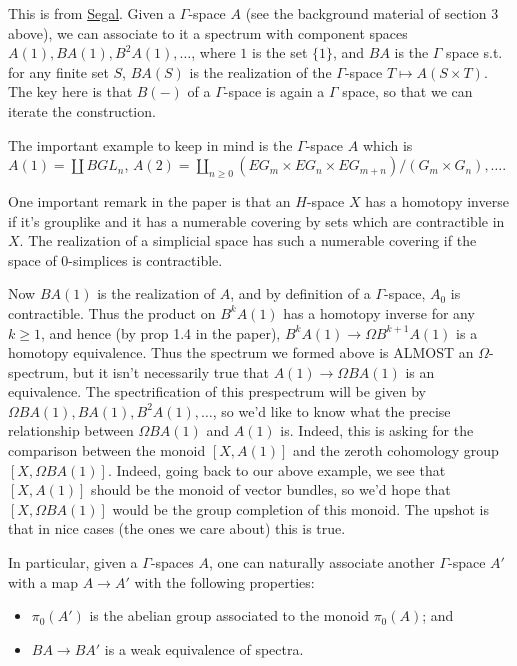 \documentclass[letterpaper]{article}
\theoremstyle{definition}
\begin{document}
This is from
\href{References/CategoriesAndCohomologyTheories.pdf}{Segal}. Given a
$\Gamma$-space $A$ (see the background material of section 3 above), we
can associate to it a spectrum with component spaces $A(1), BA(1),
B^2A(1), \dots $, where $1$ is the set $\{1\}$, and $BA$ is the
$\Gamma$ space s.t. for any finite set $S$, $BA(S)$ is the realization
of the $\Gamma$-space $T \mapsto A(S \times T)$. The key here is that
$B(-)$ of a $\Gamma$-space is again a $\Gamma$ space, so that we can
iterate the construction. 

The important example to keep in mind is the $\Gamma$-space $A$ which
is $A(1) = \coprod BGL_n$, $A(2) = \coprod_{n \geq 0} (EG_m \times
EG_n \times EG_{m+n})/(G_m \times G_n) , \dots$.

One important remark in the paper is that an $H$-space $X$ has a
homotopy inverse if it's grouplike and it has a numerable covering by
sets which are contractible in $X$. The realization of a simplicial
space has such a numerable covering if the space of $0$-simplices is
contractible. 

Now $BA(1)$ is the realization of $A$, and by definition of a
$\Gamma$-space, $A_0$ is contractible. Thus the product on $B^kA(1)$
has a homotopy inverse for any $k \geq 1$, and hence (by prop 1.4 in
the paper), $B^kA(1) \rightarrow \Omega B^{k+1}A(1)$ is a homotopy
equivalence. Thus the spectrum we formed above is ALMOST an
$\Omega$-spectrum, but it isn't necessarily true that $A(1)\rightarrow
\Omega BA(1)$ is an equivalence. The spectrification of this
prespectrum will be given by $\Omega BA(1), BA(1), B^2A(1),\dots $, so
we'd like to know what the precise relationship between $\Omega BA(1)$
and $A(1)$ is. Indeed, this is asking for the comparison between the
monoid $[X,A(1)]$ and the zeroth cohomology group $[X,\Omega
BA(1)]$. Indeed, going back to our above example, we see that
$[X,A(1)]$ should be the monoid of vector bundles, so we'd hope that
$[X,\Omega BA(1)]$ would be the group completion of this monoid. The
upshot is that in nice cases (the ones we care about) this is true. 

In
particular, given a $\Gamma$-spaces $A$, one can naturally associate
another $\Gamma$-space $A'$ with a map $A \rightarrow A'$ with the
following properties:
\begin{itemize}
\item $\pi_0(A')$ is the abelian group associated to the monoid
  $\pi_0(A)$; and
\item $BA \rightarrow BA'$ is a weak equivalence of spectra. 
\end{itemize}
\end{document}

